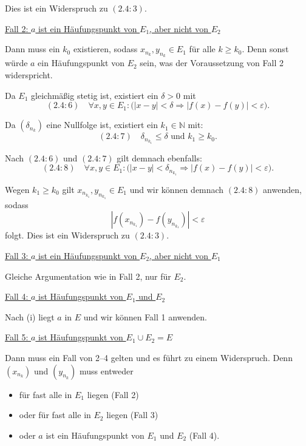 \documentclass[a4paper,12pt]{article}
\begin{document}
\begin{enumerate}[label=\alph*)]
          Dies ist ein Widerspruch zu $(2.4{:}3)$.

          \bigskip

          \underline{Fall 2: $a$ ist ein Häufungspunkt von $E_1$, aber nicht von $E_2$}

          Dann muss ein $k_0$ existieren, sodass $x_{n_k}, y_{n_k} \in E_1$ für alle $k \geq k_0$. Denn sonst würde $a$ ein Häufungspunkt von $E_2$ sein, was der Voraussetzung von Fall 2 widerspricht.

          Da $E_1$ gleichmäßig stetig ist, existiert ein $\delta > 0$ mit
          \[
              (2.4{:}6) \quad \forall x, y \in E_1 : \bigl( |x - y| < \delta \Rightarrow |f(x) - f(y)| < \varepsilon \bigr).
          \]

          Da $(\delta_{n_k})$ eine Nullfolge ist, existiert ein $k_1 \in \mathbb{N}$ mit:
          \[
              (2.4{:}7) \quad \delta_{n_{k_1}} \leq \delta \text{ und } k_1 \geq k_0.
          \]

          Nach $(2.4{:}6)$ und $(2.4{:}7)$ gilt demnach ebenfalls:
          \[
              (2.4{:}8) \quad \forall x, y \in E_1 : \bigl( |x - y| < \delta_{n_{k_1}} \Rightarrow |f(x) - f(y)| < \varepsilon \bigr).
          \]

          Wegen $k_1 \geq k_0$ gilt $x_{n_{k_1}}, y_{n_{k_1}} \in E_1$ und wir können demnach $(2.4{:}8)$ anwenden, sodass
          \[
              |f(x_{n_{k_1}}) - f(y_{n_{k_1}})| < \varepsilon
          \]
          folgt. Dies ist ein Widerspruch zu $(2.4{:}3)$.

          \bigskip

          \underline{Fall 3: $a$ ist ein Häufungspunkt von $E_2$, aber nicht von $E_1$}

          Gleiche Argumentation wie in Fall 2, nur für $E_2$.

          \bigskip

          \underline{Fall 4: $a$ ist Häufungspunkt von $E_1$ und $E_2$}

          Nach (i) liegt $a$ in $E$ und wir können Fall 1 anwenden.

          \bigskip

          \underline{Fall 5: $a$ ist Häufungspunkt von $E_1 \cup E_2 = E$}

          Dann muss ein Fall von 2--4 gelten und es führt zu einem Widerspruch. Denn $(x_{n_k})$ und $(y_{n_k})$ muss entweder
          \begin{itemize}
              \item für fast alle in $E_1$ liegen (Fall 2)
              \item oder für fast alle in $E_2$ liegen (Fall 3)
              \item oder $a$ ist ein Häufungspunkt von $E_1$ und $E_2$ (Fall 4).
          \end{itemize}


\end{enumerate}
\end{document}
